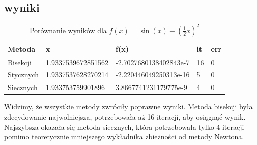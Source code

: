 \documentclass{article}
\begin{document}
\subsection*{wyniki}
\begin{table}[h]
  \centering
  \begin{tabular}{|l|l|l|l|l|}
  \hline
  \textbf{Metoda}      & \textbf{x}              & \textbf{f(x)}                   & \textbf{it} & \textbf{err} \\ \hline
  Bisekcji             & 1.9337539672851562      & -2.7027680138402843e-7          & 16          & 0            \\ \hline
  Stycznych            & 1.9337537628270214      & -2.220446049250313e-16          & 5           & 0            \\ \hline
  Siecznych            & 1.933753759901896       & 3.8667741231179775e-9           & 4           & 0            \\ \hline
  \end{tabular}
  \caption{Porównanie wyników dla $f(x)=\sin(x)-{(\frac{1}{2}x)}^2$}
\end{table}
Widzimy, że wszystkie metody zwróciły poprawne wyniki.
Metoda bisekcji była zdecydowanie najwolniejsza, potrzebowała
aż 16 iteracji, aby osiągnąć wynik. Najszybsza okazała się metoda
siecznych, która potrzebowała tylko 4 iteracji pomimo teoretycznie
mniejszego wykładnika zbieżności od metody Newtona.
\end{document}
